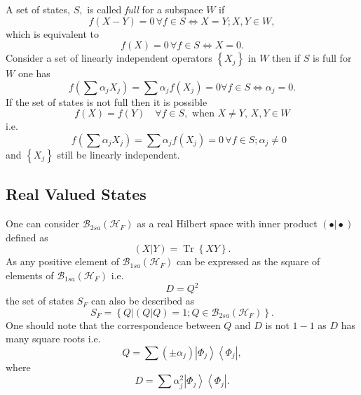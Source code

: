 \documentclass[aps,preprint]{revtex4}%
\begin{document}
A set of states, $S,$ is called \emph{full} for a subspace $W$ if
\begin{equation}
f\left(  X-Y\right)  =0\,\forall f\in S\Leftrightarrow X=Y;X,Y\in W,
\end{equation}
which is equivalent to
\begin{equation}
f\left(  X\right)  =0\,\forall f\in S\Leftrightarrow X=0.
\end{equation}
Consider a set of linearly independent operators $\left\{  X_{j}\right\}  $ in
$W$ then if $S$ is full for $W$ one has
\begin{equation}
f\left(  \sum\alpha_{j}X_{j}\right)  =\sum\alpha_{j}f\left(  X_{j}\right)
=0\forall f\in S\Leftrightarrow\alpha_{j}=0.
\end{equation}
If the set of states is not full then it is possible
\begin{equation}
f\left(  X\right)  =f\left(  Y\right)  \quad\forall f\in S,\text{ when }X\neq
Y,\,X,Y\in W
\end{equation}
i.e.
\begin{equation}
f\left(  \sum\alpha_{j}X_{j}\right)  =\sum\alpha_{j}f\left(  X_{j}\right)
=0\,\forall f\in S;\alpha_{j}\neq0\text{ }%
\end{equation}
and $\left\{  X_{j}\right\}  $ still be linearly independent.

\subsection{ Real Valued States}

One can consider $\mathcal{B}_{2sa}\left(  \mathcal{H}_{F}\right)  $ as a real
Hilbert space with inner product $\left(  \left.  \bullet\right\vert
\bullet\right)  $ defined as
\begin{equation}
\left(  \left.  X\right\vert Y\right)  =\operatorname{Tr}\left\{  XY\right\}
.
\end{equation}
As any positive element of $\mathcal{B}_{1sa}\left(  \mathcal{H}_{F}\right)  $
can be expressed as the square of elements of $\mathcal{B}_{1sa}\left(
\mathcal{H}_{F}\right)  $ i.e.%
\begin{equation}
D=Q^{2}%
\end{equation}
the set of states $S_{F}$ can also be described as
\begin{equation}
S_{F}=\left\{  \left.  Q\right\vert \left(  \left.  Q\right\vert Q\right)
=1;Q\in\mathcal{B}_{2sa}\left(  \mathcal{H}_{F}\right)  \right\}  .
\end{equation}
One should note that the correspondence between $Q$ and $D$ is not $1-1$ as
$D$ has many square roots i.e.
\begin{equation}
Q=\sum\left(  \pm\alpha_{j}\right)  \left\vert \Phi_{j}\right\rangle
\left\langle \Phi_{j}\right\vert ,
\end{equation}
where
\begin{equation}
D=\sum\alpha_{j}^{2}\left\vert \Phi_{j}\right\rangle \left\langle \Phi
_{j}\right\vert .
\end{equation}
\end{document}
